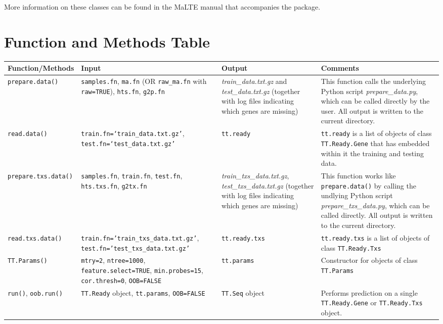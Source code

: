 \documentclass[a4paper,12pt]{article}
\begin{document}
More information on these classes can be found in the \textsf{MaLTE} manual that accompanies the package.

\pagebreak
\section{Function and Methods Table}
\label{functions}

\begin{table}[H]
\scriptsize
\centering
\begin{tabular}{|p{2.5cm}|p{4cm}|p{4cm}|p{5cm}|}
\hline
\textbf{Function/Methods} & \textbf{Input} & \textbf{Output} & \textbf{Comments} \\
\hline
\texttt{prepare.data()} & \texttt{samples.fn}, \texttt{ma.fn} (OR \texttt{raw\_ma.fn} with \texttt{raw=TRUE}), \texttt{hts.fn}, \texttt{g2p.fn} & \textit{train\_data.txt.gz} and \textit{test\_data.txt.gz}  (together with log files indicating which genes are missing) & This function calls the underlying \textsf{Python} script \textit{prepare\_data.py}, which can be called directly by the user. All output is written to the current directory. \\
\hline
\texttt{read.data()} & \texttt{train.fn=`train\_data.txt.gz'}, \texttt{test.fn=`test\_data.txt.gz'} & \texttt{tt.ready} & \texttt{tt.ready} is a list of objects of class \texttt{TT.Ready.Gene} that has embedded within it the training and testing data. \\
\hline
\texttt{prepare.txs.data()} & \texttt{samples.fn}, \texttt{train.fn}, \texttt{test.fn}, \texttt{hts.txs.fn}, \texttt{g2tx.fn} & \textit{train\_txs\_data.txt.gz}, \textit{test\_txs\_data.txt.gz} (together with log files indicating which genes are missing) & 
This function works like \texttt{prepare.data()} by calling the undlying \textsf{Python} script \textit{prepare\_txs\_data.py}, which can be called directly. All output is written to the current directory. \\
\hline
\texttt{read.txs.data()} & \texttt{train.fn='train\_txs\_data.txt.gz'}, \texttt{test.fn='test\_txs\_data.txt.gz'} & \texttt{tt.ready.txs} & \texttt{tt.ready.txs} is a list of objects of class \texttt{TT.Ready.Txs} \\
\hline
\texttt{TT.Params()} & \texttt{mtry=2}, \texttt{ntree=1000}, \texttt{feature.select=TRUE}, \texttt{min.probes=15}, \texttt{cor.thresh=0}, \texttt{OOB=FALSE} & \texttt{tt.params} & Constructor for objects of class \texttt{TT.Params} \\
\hline
\texttt{run()}, \texttt{oob.run()} & \texttt{TT.Ready} object, \texttt{tt.params}, \texttt{OOB=FALSE} & \texttt{TT.Seq} object & Performs prediction on a single \texttt{TT.Ready.Gene} or \texttt{TT.Ready.Txs} object. \\

\end{tabular}
\end{table}
\end{document}
